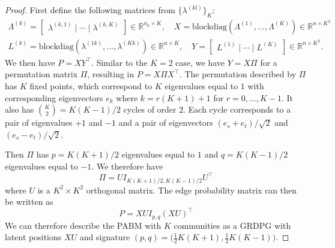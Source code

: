 \documentclass[12pt]{article}
\begin{document}
\begin{proof}
First define the following matrices from $\{\lambda^{(kl)}\}_K$: 
\begin{gather}
\label{eq:xy}
\Lambda^{(k)} = \begin{bmatrix} \lambda^{(k,1)} \mid \cdots \mid \lambda^{(k, K)} \end{bmatrix}
\in \mathbb{R}^{n_k \times K}, \quad 
X = \text{blockdiag}(\Lambda^{(1)}, \dots, \Lambda^{(K)}) \in
\mathbb{R}^{n \times K^2} \\
L^{(k)} = \text{blockdiag}(\lambda^{(1k)}, \dots, \lambda^{(Kk)}) \in 
\mathbb{R}^{n \times K}, \quad 
Y = \begin{bmatrix} L^{(1)} \mid \cdots \mid L^{(K)} \end{bmatrix} \in
\mathbb{R}^{n \times K^2}.
\end{gather}
We then have $P = X Y^\top$. Similar to the $K = 2$ case, we have $Y = X \Pi$ for a permutation matrix
$\Pi$, resulting in $P = X \Pi X^\top$.  
The permutation described by $\Pi$ has $K$ fixed points, which correspond to 
$K$ eigenvalues equal to $1$ with corresponding eigenvectors $e_k$ where 
$k = r (K + 1) + 1$ for $r = 0, ..., K - 1$. It also has 
$\binom{K}{2} = K (K - 1) / 2$ cycles of order $2$. Each cycle corresponds to 
a pair of eigenvalues $+1$ and $-1$ and a pair of eigenvectors 
$(e_s + e_t) / \sqrt{2}$ and $(e_s - e_t) / \sqrt{2}$.

Then $\Pi$ has $p = K (K + 1) / 2$ eigenvalues equal to $1$ and $q = K (K - 1) / 2$ 
eigenvalues equal to $-1$. We therefore have
\begin{equation} \label{eq:permutation}
\Pi = U I_{K (K + 1) / 2, K (K - 1) / 2} U^\top
\end{equation}
where $U$ is a $K^2 \times K^2$ orthogonal matrix. The edge probability matrix can then be written as
\begin{equation} \label{eq:pabm-grdpg}
P = X U I_{p, q} (X U)^\top
\end{equation}
We can therefore describe the PABM with $K$ communities as a GRDPG with latent 
positions $X U$ and signature $(p,q) = \bigl( \tfrac{1}{2} K (K + 1) ,
\tfrac{1}{2} K (K - 1)\bigr)$.
\end{proof}
\end{document}
